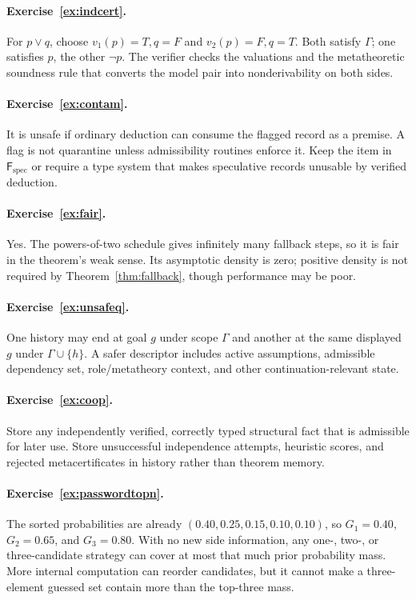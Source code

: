 \documentclass[11pt,openany]{book}
\theoremstyle{definition}
\theoremstyle{remark}
\newcommand{\Future}{\mathsf{F}}
\newcommand{\Spec}{\Future_{\mathrm{spec}}}
\begin{document}
\paragraph{Exercise~\ref{ex:indcert}.}
For $p\lor q$, choose $v_1(p)=T,q=F$ and $v_2(p)=F,q=T$. Both satisfy $\Gamma$; one satisfies $p$, the other $\neg p$. The verifier checks the valuations and the metatheoretic soundness rule that converts the model pair into nonderivability on both sides.

\paragraph{Exercise~\ref{ex:contam}.}
It is unsafe if ordinary deduction can consume the flagged record as a premise. A flag is not quarantine unless admissibility routines enforce it. Keep the item in $\Spec$ or require a type system that makes speculative records unusable by verified deduction.

\paragraph{Exercise~\ref{ex:fair}.}
Yes. The powers-of-two schedule gives infinitely many fallback steps, so it is fair in the theorem's weak sense. Its asymptotic density is zero; positive density is not required by Theorem~\ref{thm:fallback}, though performance may be poor.

\paragraph{Exercise~\ref{ex:unsafeq}.}
One history may end at goal $g$ under scope $\Gamma$ and another at the same displayed $g$ under $\Gamma\cup\{h\}$. A safer descriptor includes active assumptions, admissible dependency set, role/metatheory context, and other continuation-relevant state.

\paragraph{Exercise~\ref{ex:coop}.}
Store any independently verified, correctly typed structural fact that is admissible for later use. Store unsuccessful independence attempts, heuristic scores, and rejected metacertificates in history rather than theorem memory.


\paragraph{Exercise~\ref{ex:passwordtopn}.}
The sorted probabilities are already $(0.40,0.25,0.15,0.10,0.10)$, so $G_1=0.40$, $G_2=0.65$, and $G_3=0.80$. With no new side information, any one-, two-, or three-candidate strategy can cover at most that much prior probability mass. More internal computation can reorder candidates, but it cannot make a three-element guessed set contain more than the top-three mass.
\end{document}
